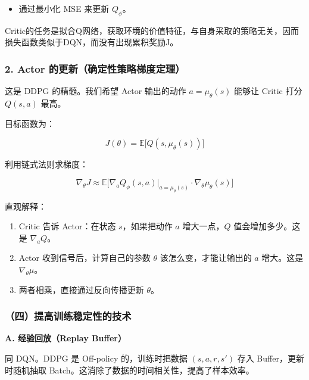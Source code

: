 \begin{itemize}
\tightlist
\item
  通过最小化 MSE 来更新 \(Q_\phi\)。
\end{itemize}

Critic的任务是拟合Q网络，获取环境的价值特征，与自身采取的策略无关，因而损失函数类似于DQN，而没有出现累积奖励J。

\hypertarget{actor-ux7684ux66f4ux65b0ux786eux5b9aux6027ux7b56ux7565ux68afux5ea6ux5b9aux7406}{%
\subsubsection{2. Actor 的更新（确定性策略梯度定理）}\label{actor-ux7684ux66f4ux65b0ux786eux5b9aux6027ux7b56ux7565ux68afux5ea6ux5b9aux7406}}

这是 DDPG 的精髓。我们希望 Actor 输出的动作 \(a=\mu_\theta(s)\) 能够让 Critic 打分 \(Q(s,a)\) 最高。

目标函数为：

\[
J(\theta)
=
\mathbb{E}\bigl[
Q(s,\mu_\theta(s))
\bigr]
\]

利用链式法则求梯度：

\[
\nabla_\theta J
\approx
\mathbb{E}
\bigl[
\nabla_a Q_\phi(s,a)
\big|_{a=\mu_\theta(s)}
\cdot
\nabla_\theta \mu_\theta(s)
\bigr]
\]

直观解释：

\begin{enumerate}
\def\labelenumi{\arabic{enumi}.}
\tightlist
\item
  Critic 告诉 Actor：在状态 \(s\)，如果把动作 \(a\) 增大一点，\(Q\) 值会增加多少。这是 \(\nabla_a Q\)。
\item
  Actor 收到信号后，计算自己的参数 \(\theta\) 该怎么变，才能让输出的 \(a\) 增大。这是 \(\nabla_\theta\mu\)。
\item
  两者相乘，直接通过反向传播更新 \(\theta\)。
\end{enumerate}

\hypertarget{ux56dbux63d0ux9ad8ux8badux7ec3ux7a33ux5b9aux6027ux7684ux6280ux672f}{%
\subsubsection{（四）提高训练稳定性的技术}\label{ux56dbux63d0ux9ad8ux8badux7ec3ux7a33ux5b9aux6027ux7684ux6280ux672f}}

\textbf{A. 经验回放（Replay Buffer）}

同 DQN。DDPG 是 Off-policy 的，训练时把数据 \((s,a,r,s')\) 存入 Buffer，更新时随机抽取 Batch。这消除了数据的时间相关性，提高了样本效率。

